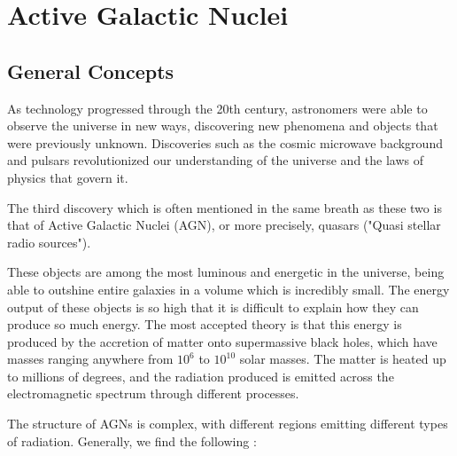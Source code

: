 \chapter{Active Galactic Nuclei}
\label{chap:Active Galactic Nuclei}
\section{General Concepts}
As technology progressed through the 20th century, astronomers were able to observe the universe in new ways, discovering new phenomena and objects that were previously unknown. Discoveries such as the cosmic microwave background and pulsars revolutionized our understanding of the universe and the laws of physics that govern it.

The third discovery which is often mentioned in the same breath as these two is that of Active Galactic Nuclei (AGN), or more precisely, quasars ("Quasi stellar radio sources").

These objects are among the most luminous and energetic in the universe, being able to outshine entire galaxies in a volume which is incredibly small. The energy output of these objects is so high that it is difficult to explain how they can produce so much energy. The most accepted theory is that this energy is produced by the accretion of matter onto supermassive black holes, which have masses ranging anywhere from $10^6$ to $10^{10}$ solar masses. The matter is heated up to millions of degrees, and the radiation produced is emitted across the electromagnetic spectrum through different processes.

The structure of AGNs is complex, with different regions emitting different types of radiation. Generally, we find the following \citep{RadiativeProcesses}:

